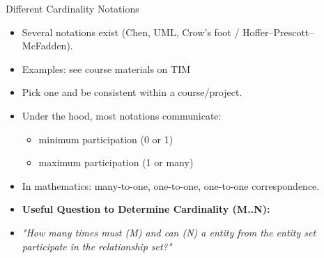 \documentclass[10pt,aspectratio=169]{beamer}
\begin{document}
\begin{frame}{Different Cardinality Notations}
\begin{itemize}
  \item Several notations exist (Chen, UML, Crow's foot / Hoffer--Prescott--McFadden).
  \item Examples: see course materials on TIM
  \item Pick one and be consistent within a course/project.
  \item Under the hood, most notations communicate:
  \begin{itemize}
    \item minimum participation (0 or 1)
    \item maximum participation (1 or many)
  \end{itemize}
  \item In mathematics: many-to-one, one-to-one, one-to-one correspondence.
  \item \textbf{Useful Question to Determine Cardinality (M..N):} 
  \item[] \textit{"How many times must (M) and can (N) a entity from the entity set participate in the relationship set?"}
\end{itemize}
\end{frame}
\end{document}
